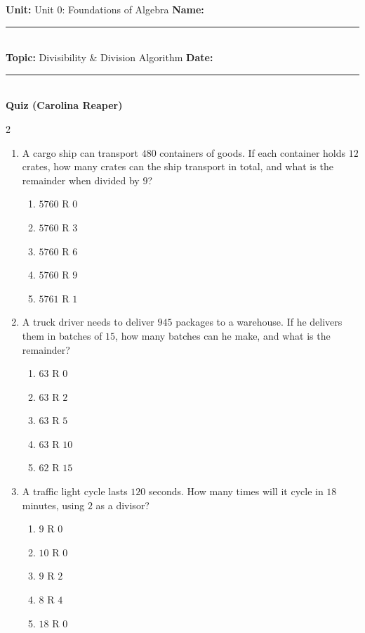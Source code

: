 \documentclass[10pt]{article}
\begin{document}
\enlargethispage{2.5cm}

\begin{tcolorbox}[colback=mainblue!5, colframe=mainblue, sharp corners, boxrule=0.5pt]
    \small \textbf{Unit:} Unit 0: Foundations of Algebra \hfill \textbf{Name:} \rule{3cm}{0.4pt} \\
    \small \textbf{Topic:} Divisibility & Division Algorithm \hfill \textbf{Date:} \rule{2cm}{0.4pt} \\
    \centering \textbf{\large Quiz (Carolina Reaper)}
\end{tcolorbox}

\vspace{0.2cm}

\begin{multicols}{2}
\begin{enumerate}[label=\textbf{Q\arabic*.}, leftmargin=*, itemsep=6pt, parsep=0pt]

  \item \small A cargo ship can transport $480$ containers of goods. If each container holds $12$ crates, how many crates can the ship transport in total, and what is the remainder when divided by $9$?
  \begin{enumerate}[label=(\Alph*), leftmargin=0.6cm, nosep, itemsep=2pt]
    \item $5760$ R $0$
    \item $5760$ R $3$
    \item $5760$ R $6$
    \item $5760$ R $9$
    \item $5761$ R $1$
  \end{enumerate}

  \item \small A truck driver needs to deliver $945$ packages to a warehouse. If he delivers them in batches of $15$, how many batches can he make, and what is the remainder?
  \begin{enumerate}[label=(\Alph*), leftmargin=0.6cm, nosep, itemsep=2pt]
    \item $63$ R $0$
    \item $63$ R $2$
    \item $63$ R $5$
    \item $63$ R $10$
    \item $62$ R $15$
  \end{enumerate}

  \item \small A traffic light cycle lasts $120$ seconds. How many times will it cycle in $18$ minutes, using $2$ as a divisor?
  \begin{enumerate}[label=(\Alph*), leftmargin=0.6cm, nosep, itemsep=2pt]
    \item $9$ R $0$
    \item $10$ R $0$
    \item $9$ R $2$
    \item $8$ R $4$
    \item $18$ R $0$
  \end{enumerate}


\end{enumerate}
\end{multicols}
\end{document}
